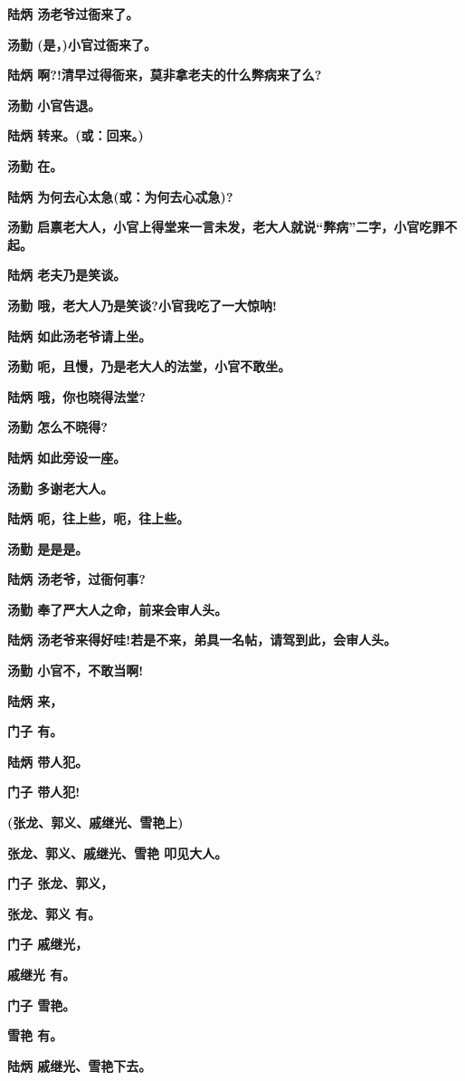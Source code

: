 \textbf{陆炳 汤老爷过衙来了。}

\textbf{汤勤 (是，)小官过衙来了。}

\textbf{陆炳 啊?!清早过得衙来，莫非拿老夫的什么弊病来了么?}

\textbf{汤勤 小官告退。}

\textbf{陆炳 转来。(或：回来。)}

\textbf{汤勤 在。}

\textbf{陆炳 为何去心太急(或：为何去心忒急)?}

\textbf{汤勤
启禀老大人，小官上得堂来一言未发，老大人就说``弊病''二字，小官吃罪不起。}

\textbf{陆炳 老夫乃是笑谈。}

\textbf{汤勤 哦，老大人乃是笑谈?小官我吃了一大惊呐!}

\textbf{陆炳 如此汤老爷请上坐。}

\textbf{汤勤 呃，且慢，乃是老大人的法堂，小官不敢坐。}

\textbf{陆炳 哦，你也晓得法堂?}

\textbf{汤勤 怎么不晓得?}

\textbf{陆炳 如此旁设一座。}

\textbf{汤勤 多谢老大人。}

\textbf{陆炳 呃，往上些，呃，往上些。}

\textbf{汤勤 是是是。}

\textbf{陆炳 汤老爷，过衙何事?}

\textbf{汤勤 奉了严大人之命，前来会审人头。}

\textbf{陆炳 汤老爷来得好哇!若是不来，弟具一名帖，请驾到此，会审人头。}

\textbf{汤勤 小官不，不敢当啊!}

\textbf{陆炳 来，}

\textbf{门子 有。}

\textbf{陆炳 带人犯。}

\textbf{门子 带人犯!}

\textbf{(张龙、郭义、戚继光、雪艳上)}

\textbf{张龙、郭义、戚继光、雪艳 叩见大人。}

\textbf{门子 张龙、郭义，}

\textbf{张龙、郭义 有。}

\textbf{门子 戚继光，}

\textbf{戚继光 有。}

\textbf{门子 雪艳。}

\textbf{雪艳 有。}

\textbf{陆炳 戚继光、雪艳下去。}

